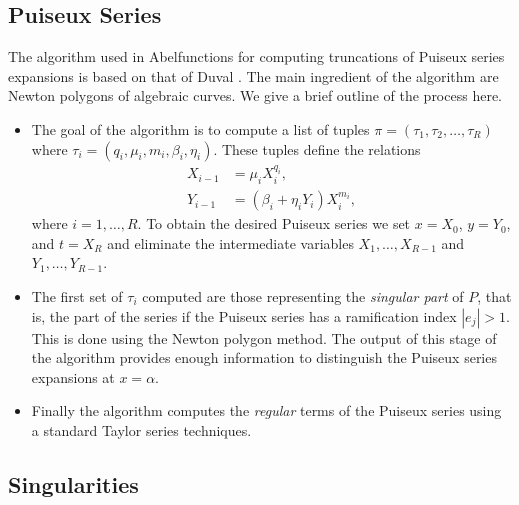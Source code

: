 \subsection{Puiseux Series}\label{subsec:abelfunctions-puiseux-series}

The algorithm used in Abelfunctions for computing truncations of Puiseux series
expansions is based on that of Duval \cite{Duval89}. The main ingredient of the
algorithm are Newton polygons of algebraic curves. We give a brief outline of
the process here.
\begin{itemize}
\item The goal of the algorithm is to compute a list of tuples $\pi = (\tau_1,
  \tau_2, \ldots, \tau_R)$ where $\tau_i = (q_i,\mu_i,m_i,\beta_i,\eta_i)$.
  These tuples define the relations
  \begin{align*}
    X_{i-1} &= \mu_i X_i^{q_i}, \\
    Y_{i-1} &= (\beta_i + \eta_iY_i)X_i^{m_i},
  \end{align*}
  where $i = 1, \ldots, R$. To obtain the desired Puiseux series we set $x =
  X_0$, $y = Y_0$, and $t = X_R$ and eliminate the intermediate variables
  $X_1,\ldots,X_{R-1}$ and $Y_1,\ldots,Y_{R-1}$.
\item The first set of $\tau_i$ computed are those representing the {\it
    singular part} of $P$, that is, the part of the series if the Puiseux series
  has a ramification index $|e_j|>1$. This is done using the Newton polygon
  method. The output of this stage of the algorithm provides enough information
  to distinguish the Puiseux series expansions at $x=\alpha$.
\item Finally the algorithm computes the {\it regular} terms of the Puiseux
  series using a standard Taylor series techniques.
\end{itemize}


\subsection{Singularities}\label{subsec:abelfunctions-singularities}


